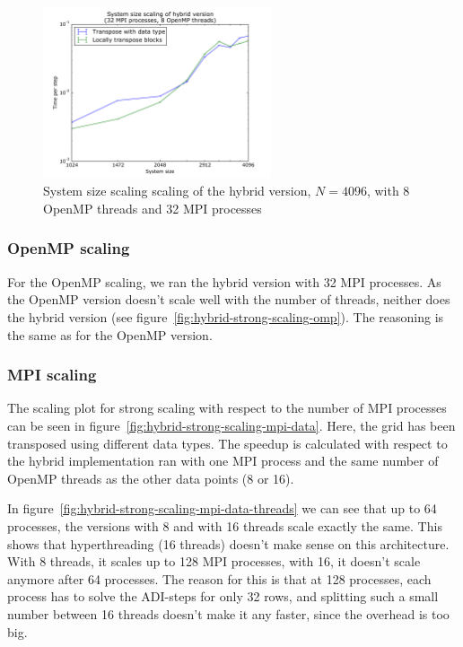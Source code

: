 \documentclass[a4paper]{article}
\begin{document}
\begin{figure}
	\centering
	\includegraphics[width=0.6\textwidth]{hybrid_size_scaling.pdf}
	\caption{System size scaling scaling of the hybrid version, $N=4096$, with 8 OpenMP threads and 32 MPI processes}
	\label{fig:hybrid-size-scaling}
\end{figure}


\subsubsection{OpenMP scaling}
For the OpenMP scaling, we ran the hybrid version with 32 MPI processes.
As the OpenMP version doesn't scale well with the number of threads, neither does the hybrid version (see figure~\ref{fig:hybrid-strong-scaling-omp}).
The reasoning is the same as for the OpenMP version.


\subsubsection{MPI scaling}
The scaling plot for strong scaling with respect to the number of MPI processes can be seen in figure~\ref{fig:hybrid-strong-scaling-mpi-data}.
Here, the grid has been transposed using different data types.
The speedup is calculated with respect to the hybrid implementation ran with one MPI process and the same number of OpenMP threads as the other data points (8 or 16).

In figure~\ref{fig:hybrid-strong-scaling-mpi-data-threads} we can see that up to 64 processes, the versions with 8 and with 16 threads scale exactly the same.
This shows that hyperthreading (16 threads) doesn't make sense on this architecture.
With 8 threads, it scales up to 128 MPI processes, with 16, it doesn't scale anymore after 64 processes.
The reason for this is that at 128 processes, each process has to solve the ADI-steps for only 32 rows, and splitting such a small number between 16 threads doesn't make it any faster, since the overhead is too big.
\end{document}

